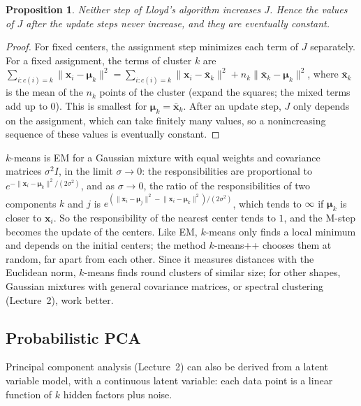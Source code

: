 \documentclass[11pt]{article}
\newcommand{\norm}[1]{\lVert #1 \rVert}
\theoremstyle{definition}
\theoremstyle{plain}
\newtheorem{proposition}[definition]{Proposition}
\theoremstyle{remark}
\begin{document}
\begin{proposition}\label{prop:kmeans}
    Neither step of Lloyd's algorithm increases $J$. Hence the values of $J$ after the update steps never increase, and they are eventually constant.
\end{proposition}

\begin{proof}
    For fixed centers, the assignment step minimizes each term of $J$ separately. For a fixed assignment, the terms of cluster $k$ are $\sum_{i : c(i) = k}\norm{\mathbf{x}_i - \boldsymbol{\mu}_k}^2 = \sum_{i : c(i) = k}\norm{\mathbf{x}_i - \bar{\mathbf{x}}_k}^2 + n_k\norm{\bar{\mathbf{x}}_k - \boldsymbol{\mu}_k}^2$, where $\bar{\mathbf{x}}_k$ is the mean of the $n_k$ points of the cluster (expand the squares; the mixed terms add up to $0$). This is smallest for $\boldsymbol{\mu}_k = \bar{\mathbf{x}}_k$. After an update step, $J$ only depends on the assignment, which can take finitely many values, so a nonincreasing sequence of these values is eventually constant.
\end{proof}

$k$-means is EM for a Gaussian mixture with equal weights and covariance matrices $\sigma^2I$, in the limit $\sigma \to 0$: the responsibilities are proportional to $e^{-\norm{\mathbf{x}_i - \boldsymbol{\mu}_k}^2/(2\sigma^2)}$, and as $\sigma \to 0$, the ratio of the responsibilities of two components $k$ and $j$ is $e^{(\norm{\mathbf{x}_i - \boldsymbol{\mu}_j}^2 - \norm{\mathbf{x}_i - \boldsymbol{\mu}_k}^2)/(2\sigma^2)}$, which tends to $\infty$ if $\boldsymbol{\mu}_k$ is closer to $\mathbf{x}_i$. So the responsibility of the nearest center tends to $1$, and the M-step becomes the update of the centers. Like EM, $k$-means only finds a local minimum and depends on the initial centers; the method $k$-means++ chooses them at random, far apart from each other. Since it measures distances with the Euclidean norm, $k$-means finds round clusters of similar size; for other shapes, Gaussian mixtures with general covariance matrices, or spectral clustering (Lecture~2), work better.

\subsection{Probabilistic PCA}\label{sec:ppca}

Principal component analysis (Lecture~2) can also be derived from a latent variable model, with a continuous latent variable: each data point is a linear function of $k$ hidden factors plus noise.
\end{document}
